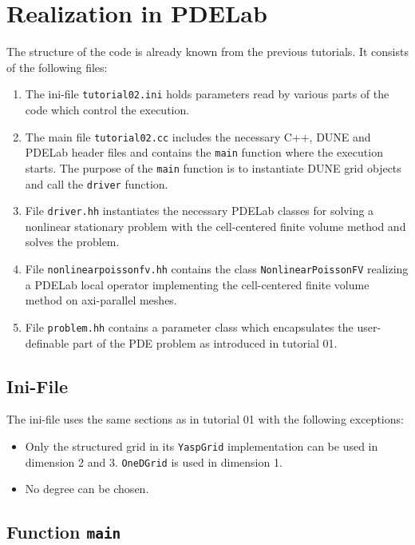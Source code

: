 \documentclass[a4paper,12pt]{article}
\begin{document}
\section{Realization in PDELab}

The structure of the code is already known from the previous tutorials. 
It consists of the following files:
\begin{enumerate}[1)]
\item The ini-file
\lstinline{tutorial02.ini} holds parameters read by various parts of the code
which control the execution. 
\item The main file \lstinline{tutorial02.cc} includes the necessary C++,
DUNE and PDELab header files
and contains the \lstinline{main} function where the execution starts. 
The purpose of the \lstinline{main} function is
to instantiate DUNE grid objects and call the \lstinline{driver} function.
\item File \lstinline{driver.hh} instantiates the necessary PDELab classes 
for solving a nonlinear stationary problem with the cell-centered finite
volume method and solves the problem.
\item File \lstinline{nonlinearpoissonfv.hh} contains the class
\lstinline{NonlinearPoissonFV} realizing a PDELab local operator implementing
the cell-centered finite volume method on axi-parallel meshes.
\item File \lstinline{problem.hh} contains a parameter class which
encapsulates the user-definable part of the PDE problem as introduced in 
tutorial 01.
\end{enumerate}

\subsection{Ini-File}

The ini-file uses the same sections as in tutorial 01 with the following exceptions:
\begin{itemize}
\item Only the structured grid in its \lstinline{YaspGrid} implementation can be used
in dimension 2 and 3. \lstinline{OneDGrid} is used in dimension 1.
\item No degree can be chosen. 
\end{itemize}

\subsection{Function \lstinline{main}}
\end{document}
